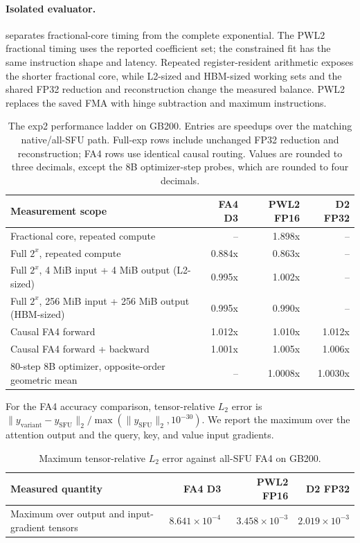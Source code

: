 \paragraph{Isolated evaluator.}
 separates fractional-core timing from the complete
exponential. The PWL2 fractional timing uses the reported coefficient set; the
constrained fit has the same instruction shape and latency. Repeated
register-resident arithmetic exposes the shorter fractional core, while
L2-sized and HBM-sized working sets and the shared FP32 reduction and
reconstruction change the measured balance. PWL2 replaces the saved FMA with
hinge subtraction and maximum instructions.

\begin{table}[t]
\centering
\reporttablefont
\caption{The exp2 performance ladder on GB200. Entries are speedups over the
matching native/all-SFU path. Full-exp rows include unchanged FP32 reduction
and reconstruction; FA4 rows use identical causal routing. Values are rounded
to three decimals, except the 8B optimizer-step probes, which are rounded to
four decimals.}
\label{tab:exp2-evidence}
\begin{tabularx}{\textwidth}{@{}Xrrr@{}}
\toprule
\textbf{Measurement scope} & \textbf{FA4 D3} & \textbf{PWL2 FP16} &
\textbf{D2 FP32} \\
\midrule
Fractional core, repeated compute & -- & 1.898x & -- \\
Full $2^x$, repeated compute & 0.884x & 0.863x & -- \\
Full $2^x$, 4 MiB input + 4 MiB output (L2-sized) & 0.995x & 1.002x & -- \\
Full $2^x$, 256 MiB input + 256 MiB output (HBM-sized) & 0.995x & 0.990x & -- \\
Causal FA4 forward & 1.012x & 1.010x & 1.012x \\
Causal FA4 forward + backward & 1.001x & 1.005x & 1.006x \\
80-step 8B optimizer, opposite-order geometric mean & -- & 1.0008x & 1.0030x \\
\bottomrule
\end{tabularx}
\end{table}

For the FA4 accuracy comparison, tensor-relative $L_2$ error is
$\lVert y_{\mathrm{variant}}-y_{\mathrm{SFU}}\rVert_2 /
\max(\lVert y_{\mathrm{SFU}}\rVert_2,10^{-30})$. We report the maximum over the
attention output and the query, key, and value input gradients.

\begin{table}[H]
\centering
\reporttablefont
\caption{Maximum tensor-relative $L_2$ error against all-SFU FA4 on GB200.}
\label{tab:exp2-accuracy}
\begin{tabularx}{\textwidth}{@{}Xrrr@{}}
\toprule
\textbf{Measured quantity} & \textbf{FA4 D3} & \textbf{PWL2 FP16} &
\textbf{D2 FP32} \\
\midrule
Maximum over output and input-gradient tensors & $8.641\times10^{-4}$ &
$3.458\times10^{-3}$ & $2.019\times10^{-3}$ \\
\bottomrule
\end{tabularx}
\end{table}

